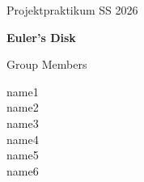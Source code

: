 \documentclass[a4paper,11pt]{article}
\begin{document}
\begin{titlepage}
    \centering

    \vspace*{2cm}

    {\Large Projektpraktikum SS 2026\par}

    \vspace{2cm}

    {\Huge\bfseries Euler's Disk\par}

    \vspace{3cm}

    {\Large Group Members\par}

    \vspace{0.5cm}

    {\large
    name1\\
    name2\\
    name3\\
    name4\\
    name5\\
    name6\par
    }

    \vfill
\end{titlepage}

\tableofcontents

\newpage



\newpage



\newpage



\newpage



\newpage

\printbibliography
\end{document}
